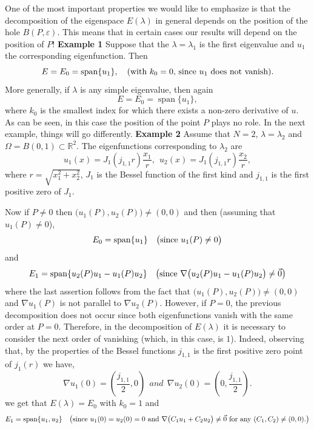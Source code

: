 \documentclass[11pt,reqno]{article}
\numberwithin{equation}{section}
\newcommand\R{\mathbb R}
\newcommand\e\varepsilon
\newcommand\la\lambda
\renewcommand\O\Omega
\begin{document}
     One of the most important properties we would like to emphasize is that the decomposition of the eigenspace $E(\la)$ in general depends on the position of the hole $B(P,\e)$. This means that in certain cases our results will depend on the position of $P$!
     \vskip0.2cm
{\bf Example 1} Suppose that the $\lambda=\la_1$ is the first eigenvalue and $u_1$ the corresponding eigenfunction. Then
\[
E = E_0 = \operatorname{span}\{u_1\}, \quad(\hbox{with $k_0=0$, since $u_1$ does not vanish}).
\]
More generally, if $\lambda$ is any simple eigenvalue, then again
\[
E = E_0= \operatorname{span}\{u_1\},
\]
where $k_0$ is the smallest index for which there exists a non-zero derivative of $u$.
   \vskip0.2cm
 As can be seen, in this case the position of the point $P$ plays no role. In the next example, things will go differently.
   \vskip0.2cm
{\bf Example 2}   
 Assume that  $N=2$, $\lambda=\lambda_2$ and $\O=B(0,1)\subset\R^2$.
The eigenfunctions corresponding to $\lambda_2$  are  
$$
u_1(x)=J_1(j_{1,1}r)\frac{x_1}{r},\ \ u_2(x)=J_1(j_{1,1}r)\frac{x_2}{r},
$$
where $r=\sqrt{x_1^2+x_2^2}$,  $J_1$ is the Bessel function of the first kind and $j_{1,1}$ is the first positive zero of $J_1$.

Now if $P\ne0$ then $\big(u_1(P),u_2(P)\big)\ne(0,0)$ and then (assuming that $u_1(P)\ne0$),
$$E_0=\operatorname{span}\{u_1\}\quad\big(\hbox{since $u_1(P)\ne0$}\big) $$
and
$$E_1= \operatorname{span}\{u_2(P)u_1-u_1(P)u_2\}\quad\big(\hbox{since $\nabla\big(u_2(P)u_1-u_1(P)u_2\big)\ne\vec{0}$}\big)$$
where the last assertion follows from the fact that $\big(u_1(P),u_2(P)\big)\ne(0,0)$ and $\nabla u_1(P)$ is not parallel to  $\nabla u_2(P)$.
\vskip0.2cm
However, if $P=0$, the previous decomposition does not occur since both eigenfunctions vanish with the same  order at $P=0$.
 Therefore, in the decomposition of $E(\lambda)$ it is necessary to consider the next order of vanishing (which, in this case, is $1$). Indeed, observing that, by the properties of the Bessel functions $j_{1,1}$ is the first positive zero point of $j_1(r)$ we have,
 \begin{equation}\label{bes}
            \nabla u_1(0)=\left(\frac{j_{1,1}}{2},0\right)\ \ and \  \  \nabla u_2(0)=\left(0,\frac{j_{1,1}}{2}\right).
        \end{equation}
we get that $E(\la)=E_0$ with $k_0=1$ and
$$E_1=\operatorname{span}\{u_1,u_2\}\quad\big(\hbox{since $u_1(0)=u_2(0)=0$ and  $\nabla\big(C_1u_1+C_2u_2\big)\ne\vec{0}$ for any $(C_1,C_2)\ne(0,0)$.}\big)$$ 
\end{document}
